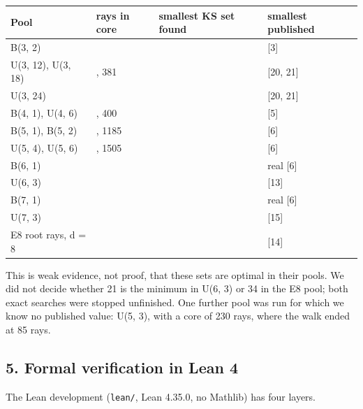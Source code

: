 \documentclass[11pt,a4paper]{article}
\begin{document}
{\def\LTcaptype{none} %
{\small
\begin{longtable}[]{@{}>{\raggedright\arraybackslash}p{}>{\raggedright\arraybackslash}p{}>{\raggedright\arraybackslash}p{}>{\raggedright\arraybackslash}p{}@{}}
\toprule\noalign{}
Pool & rays in core & smallest KS set found & smallest published \\
\midrule\noalign{}
\endhead
\bottomrule\noalign{}
\endlastfoot
B(3, 2) & 49 & 31 & 31 {[}3{]} \\
U(3, 12), U(3, 18) & 183, 381 & 33 & 33 {[}20, 21{]} \\
U(3, 24) & 651 & 36 & 33 {[}20, 21{]} \\
B(4, 1), U(4, 6) & 40, 400 & 18 & 18 {[}5{]} \\
B(5, 1), B(5, 2) & 105, 1185 & 29 & 29 {[}6{]} \\
U(5, 4), U(5, 6) & 525, 1505 & 29 & 29 {[}6{]} \\
B(6, 1) & 332 & 31 & 31 real {[}6{]} \\
U(6, 3) & 834 & 21 & 21 {[}13{]} \\
B(7, 1) & 805 & 34 & 34 real {[}6{]} \\
U(7, 3) & 2968 & 32 & 32 {[}15{]} \\
E8 root rays, d = 8 & 120 & 34 & 34 {[}14{]} \\
\end{longtable}
}
}

This is weak evidence, not proof, that these sets are optimal in their pools. We did not decide whether
21 is the minimum in U(6, 3) or 34 in the E8 pool; both exact searches were stopped unfinished. One
further pool was run for which we know no published value: U(5, 3), with a core of 230 rays, where
the walk ended at 85 rays.

\subsection{5. Formal verification in Lean 4}\label{5-formal-verification-in-lean-4}

The Lean development (\texttt{lean/}, Lean 4.35.0, no Mathlib) has four layers.
\end{document}
